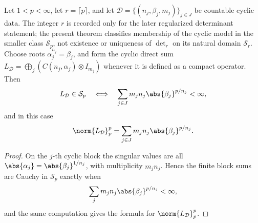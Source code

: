 \begin{theorem}
  \label{thm:schatten-cyclic-model-membership}
  Let \(1<p<\infty\), let \(r=\lceil p\rceil\), and let
  \(\mathcal D=\{(n_j,\beta_j,m_j)\}_{j\in J}\) be countable cyclic data.
  The integer \(r\) is recorded only for the later regularized
  determinant statement; the present theorem classifies membership of the
  cyclic model in the smaller class \(\mathcal S_p\), not existence or
  uniqueness of \(\det_r\) on its natural domain \(\mathcal S_r\).
  Choose roots \(\alpha_j^{n_j}=\beta_j\), and form the cyclic direct sum
  \(L_{\mathcal D}=\bigoplus_j(C(n_j,\alpha_j)\otimes I_{m_j})\) whenever
  it is defined as a compact operator. Then
  \[
    L_{\mathcal D}\in\mathcal S_p
    \quad\Longleftrightarrow\quad
    \sum_{j\in J}m_jn_j\abs{\beta_j}^{p/n_j}<\infty,
  \]
  and in this case
  \[
    \norm{L_{\mathcal D}}_p^p
    =\sum_{j\in J}m_jn_j\abs{\beta_j}^{p/n_j}.
  \]
\end{theorem}

\begin{proof}
  On the \(j\)-th cyclic block the singular values are all
  \(\abs{\alpha_j}=\abs{\beta_j}^{1/n_j}\), with multiplicity
  \(m_jn_j\). Hence the finite block sums are Cauchy in
  \(\mathcal S_p\) exactly when
  \[
    \sum_jm_jn_j\abs{\beta_j}^{p/n_j}<\infty,
  \]
  and the same computation gives the formula for
  \(\norm{L_{\mathcal D}}_p^p\).
\end{proof}

